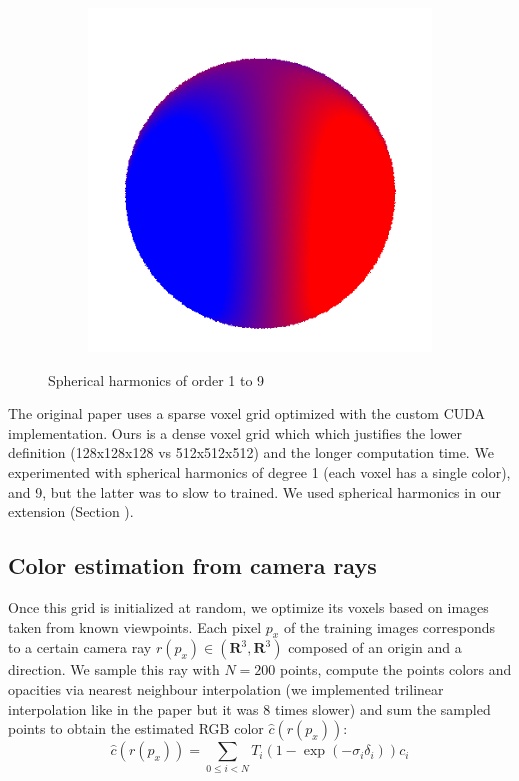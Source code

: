 \documentclass{article}
\begin{document}
\begin{figure}[!h]
\begin{subfigure}{.1\textwidth}
\end{subfigure}
\begin{subfigure}{.1\textwidth}
  \centering
  \includegraphics[width=\linewidth]{figs/spherical_harmonics/harmonics_8.png}  
\end{subfigure}
     \caption{Spherical harmonics of order 1 to 9}
    \label{fig:sph_harm}
\end{figure}


The original paper uses a sparse voxel grid optimized with the custom CUDA implementation. Ours is a dense voxel grid which which justifies the lower definition (128x128x128 vs 512x512x512) and the longer computation time. We experimented with spherical harmonics of degree 1 (each voxel has a single color), and 9, but the latter was to slow to trained. We used spherical harmonics in our extension (Section \label{sec:extent2}).

\subsection{Color estimation from camera rays}

Once this grid is initialized at random, we optimize its voxels based on images taken from known viewpoints. Each pixel $p_x$ of the training images corresponds to a certain camera ray $r(p_x) \in (\mathbf{R}^3, \mathbf{R}^3)$ composed of an origin and a direction. We sample this ray with $N=200$ points, compute the points colors and opacities via nearest neighbour interpolation (we implemented trilinear interpolation like in the paper but it was 8 times slower) and sum the sampled points to obtain the estimated RGB color $\hat{c}(r(p_x))$:
\[\hat{c}(r(p_x)) = \sum_{0\leq i<N} T_i (1 - \exp(-\sigma_i \delta_i)) c_i\] 
\end{document}
